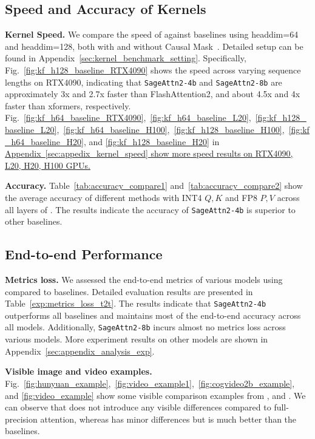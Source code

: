 \subsection{Speed and Accuracy of Kernels}

\noindent\textbf{Kernel Speed.} We compare the speed of \our against baselines using headdim=64 and headdim=128, both with and without Causal Mask~\cite{vaswani2017attention}. Detailed setup can be found in Appendix~\ref{sec:kernel_benchmark_setting}. Specifically, Fig.~\ref{fig:kf_h128_baseline_RTX4090} shows the speed across varying sequence lengths on RTX4090, indicating that \texttt{SageAttn2-4b} and \texttt{SageAttn2-8b} are approximately 3x and 2.7x faster than FlashAttention2, and about 4.5x and 4x faster than xformers, respectively.
Fig.~\ref{fig:kf_h64_baseline_RTX4090},~\ref{fig:kf_h64_baseline_L20},~\ref{fig:kf_h128_baseline_L20},~\ref{fig:kf_h64_baseline_H100},~\ref{fig:kf_h128_baseline_H100},~\ref{fig:kf_h64_baseline_H20}, and \ref{fig:kf_h128_baseline_H20} in \uline{Appendix~\ref{sec:appedix_kernel_speed} show more speed results on RTX4090, L20, H20, H100 GPUs.}




\noindent\textbf{Accuracy.} Table~\ref{tab:accuracy_compare1} and~\ref{tab:accuracy_compare2} show the average accuracy of different methods with INT4 $Q, K$ and FP8 $P, V$ across all layers of \cogvideo. The results indicate the accuracy of \texttt{SageAttn2-4b} is superior to other baselines.




\subsection{End-to-end Performance}

\noindent\textbf{Metrics loss.} We assessed the end-to-end metrics of various models using \our compared to baselines.
Detailed evaluation results are presented in Table~\ref{exp:metrics_loss_t2t}.
The results indicate that \texttt{SageAttn2-4b} outperforms all baselines and maintains most of the end-to-end accuracy across all models. Additionally, \texttt{SageAttn2-8b} incurs almost no metrics loss across various models. More experiment results on other models are shown in Appendix~\ref{sec:appendix_analysis_exp}.

\noindent\textbf{Visible image and video examples.} Fig.~\ref{fig:hunyuan_example},~\ref{fig:video_example1},~\ref{fig:cogvideo2b_example}, and \ref{fig:video_example} show some visible comparison examples from \hyvideo, \mochi and \cogvideo. We can observe that \oure does not introduce any visible differences compared to full-precision attention, whereas \ourf has minor differences but is much better than the baselines.

